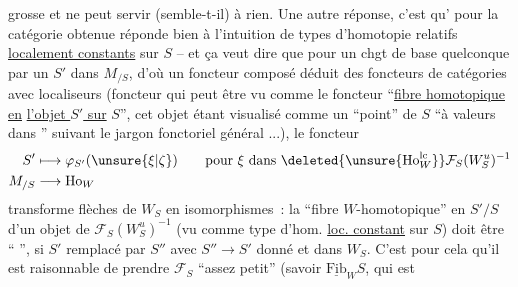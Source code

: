 grosse et ne peut servir (semble-t-il) à rien. Une autre réponse, c'est qu'   pour la catégorie obtenue réponde bien à l'intuition de  types d'homotopie relatifs \uline{localement constants} sur $S$ -- et ça veut dire que pour un chgt de base quelconque  par un $S'$ dans $M_{/S}$, d'où un foncteur composé
déduit des foncteurs de catégories avec localiseurs
(foncteur  qui peut être vu comme le foncteur ``\uline{fibre homotopique en} \uline{l'objet $S'$ sur} $S$'', cet objet étant visualisé comme un ``point'' de $S$ ``à valeurs dans '' suivant le jargon fonctoriel général ...), le foncteur
\[
\begin{aligned}
S'&\longmapsto\varphi_{S'}(\unsure{\xi|\zeta})\qquad\text{pour }\xi\text{ dans }\deleted{\unsure{\mathrm{Ho}^{\mathrm{lc}}_W}}\mathcal{F}_S(W_S^u)^{-1}\\
M_{/S}&\longrightarrow\mathrm{Ho}_W
\end{aligned}
\]
transforme flèches de $W_S$ en isomorphismes~: la ``fibre $W$-homotopique'' en $S'/S$ d'un objet de $\mathcal{F}_S(W_S^u)^{-1}$  (vu comme type d'hom. \uline{loc. constant} sur $S$) doit être `` '', si $S'$ remplacé par $S''$ avec $S''\to S'$ donné et dans $W_S$. C'est pour cela qu'il est raisonnable de prendre $\mathcal{F}_S$ ``assez petit'' (savoir $\underline{\mathrm{Fib}}_W S$, qui est

